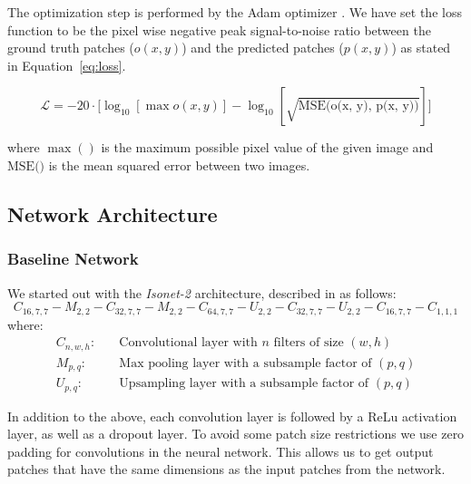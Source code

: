\documentclass[a4paper, 12pt]{article} %
\begin{document}
The optimization step is performed by the Adam optimizer \citep{kingma2014adam}. We have set the loss function to be the pixel wise negative peak signal-to-noise ratio between the ground truth patches ($o(x, y)$) and the predicted patches ($p(x, y)$) as stated in Equation~\ref{eq:loss}.

\begin{equation}\label{eq:loss}
    \mathcal{L} = -20 \cdot \big[ \log_{10}[\max o(x, y)] - \log_{10}[\sqrt{\text{MSE(o(x, y), p(x, y))}}] \big]
\end{equation}

where $\max()$ is the maximum possible pixel value of the given image and $\text{MSE()}$ is the mean squared error between two images.

\subsection{Network Architecture}
\subsubsection{Baseline Network}\label{sec:baseline}
We started out with the \textit{Isonet-2} architecture, described in \citet{WEIGERT2017} as follows:
\begin{equation}\label{eq:base-model}
    C_{16, 7, 7} - M_{2, 2} - C_{32, 7, 7} - M_{2, 2} - C_{64, 7, 7} - U_{2, 2} - C_{32, 7, 7} - U_{2, 2} - C_{16, 7, 7} - C_{1, 1, 1}
\end{equation}
where:
\begin{align}\label{network-params}
    C_{n, w, h}:\quad &\text{Convolutional layer with $n$ filters of size $(w, h)$}\\
    M_{p, q}:\quad &\text{Max pooling layer with a subsample factor of $(p, q)$}\\
    U_{p, q}:\quad &\text{Upsampling layer with a subsample factor of $(p, q)$}
\end{align}

In addition to the above, each convolution layer is followed by a ReLu activation layer, as well as a dropout layer. To avoid some patch size restrictions we use zero padding for convolutions in the neural network. This allows us to get output patches that have the same dimensions as the input patches from the network.
\end{document}
